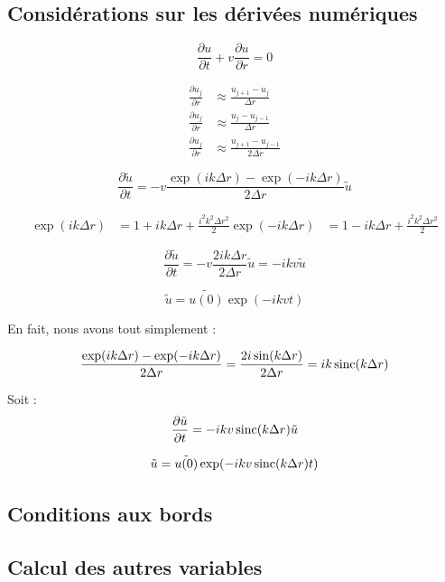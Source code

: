 \subsection{Considérations sur les dérivées numériques}

\begin{equation}
    \frac{\partial u}{\partial t} + v \frac{\partial u}{\partial r} = 0
\end{equation}

\begin{align}
    \frac{\partial u_j}{\partial r} &\approx \frac{u_{j+1} - u_j}{\Delta{r}} \\
    \frac{\partial u_j}{\partial r} &\approx \frac{u_j - u_{j-1}}{\Delta{r}} \\
    \frac{\partial u_j}{\partial r} &\approx \frac{u_{j+1} - u_{j-1}}{2 \Delta{r}}
\end{align}

\begin{equation}
    \frac{\partial \tilde{u}}{\partial t} = - v \frac{\exp(ik\Delta{r}) - \exp(-ik\Delta{r})}{2 \Delta{r}} \tilde{u}
\end{equation}

\begin{align}
    \exp(ik\Delta{r}) &= 1 + ik\Delta{r} + \frac{i^2 k^2 \Delta{r}^2}{2}
    \exp(-ik\Delta{r}) &= 1 - ik\Delta{r} + \frac{i^2 k^2 \Delta{r}^2}{2}
\end{align}

\begin{equation}
    \frac{\partial \tilde{u}}{\partial t} = - v \frac{2ik\Delta{r}}{2\Delta{r}} \tilde{u} = - i k v \tilde{u}
\end{equation}

\begin{equation}
    \tilde{u} = \tilde{u(0)} \exp(-i k v t)
\end{equation}

En fait, nous avons tout simplement :

\begin{equation}
    \frac{\exp(ik\Delta{r}) - \exp(-ik\Delta{r})}{2 \Delta{r}} = \frac{2 i \sin(k\Delta{r})}{2 \Delta{r}} = i k \operatorname{sinc}(k\Delta{r})
\end{equation}

Soit :
\begin{equation}
    \frac{\partial \tilde{u}}{\partial t} = - i k v \operatorname{sinc}(k\Delta{r}) \tilde{u}
\end{equation}

\begin{equation}
    \tilde{u} = \tilde{u(0)} \exp(-i k v \operatorname{sinc}(k \Delta{r}) t)
\end{equation}

\subsection{Conditions aux bords}

\subsection{Calcul des autres variables}

